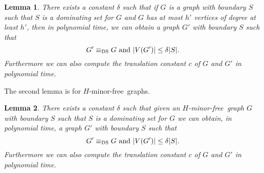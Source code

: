 \documentclass[11pt]{article}
\newtheorem{lemma}{Lemma}
\newcommand{\Hmf}{$H$-minor-free}
\newcommand{\tDS}{{\texttt{\sc DS}}}
\begin{document}
\begin{lemma}
\label{lem:newperspectivequasi}
There exists a constant $\delta$ such that if  $G$  is a graph with boundary $S$ such that $S$ is a dominating set for $G$ and $G$ has at most $h'$ vertices of degree at least $h'$, then in polynomial time, we can obtain a graph $G'$ with boundary $S$ 
such that \[G' \equiv_{\tDS} G \mbox{ and }  |V(G')| \leq \delta |S| .\] 
Furthermore we can also compute the translation constant $c$ of $G$ and $G'$ in polynomial time. 
\end{lemma}

The second lemma is for \Hmf \, graphs. 


\begin{lemma}
\label{lem:newperspectiveHminor}
There exists a constant $\delta$ such that  given an \Hmf \, graph $G$  with boundary $S$ 
such that $S$ is a dominating set for $G$ we can obtain, in polynomial time, a graph $G'$ with boundary $S$ such that 
\[G' \equiv_{\tDS} G \mbox{ and }  |V(G')| \leq \delta |S| .\] 
Furthermore we can also compute the translation constant $c$ of $G$ and $G'$ in polynomial time. 
\end{lemma}
\end{document}

